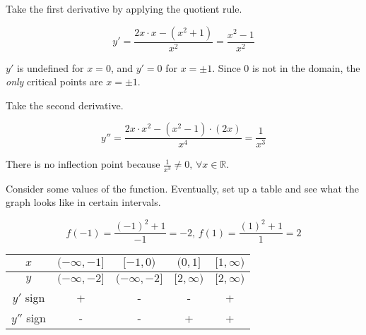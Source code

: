 \documentclass{article}
\begin{document}
\hfill

\noindent Take the first derivative by applying the quotient rule.

\begin{equation*}y' = \frac{2x\cdot x - (x^2+1)}{x^2}=\frac{x^2-1}{x^2}\end{equation*}

\hfill

\noindent $y'$ is undefined for $x=0$, and $y'=0$ for $x=\pm1$. Since 0 is not in the domain, the \textit{only} critical points are $x=\pm 1$.

\hfill

\noindent Take the second derivative.

\begin{equation*}y'' = \frac{2x\cdot x^2 - (x^2-1)\cdot(2x)}{x^4}=\frac{1}{x^3}\end{equation*}

\hfill

\noindent There is no inflection point because $\displaystyle \frac{1}{x^3} \neq 0, \, \forall x \in \mathbb{R}$.

\hfill

\noindent Consider some values of the function. Eventually, set up a table and see what the graph looks like in certain intervals.

\begin{equation*}f(-1) = \frac{(-1)^2 + 1}{-1} = -2,\,f(1) = \frac{(1)^2 + 1}{1} = 2\end{equation*}

\begin{center}
    \large
    \begin{tabular}{ |c| c c c c| } 
    \hline
        $x$ & $(-\infty, -1]$ & $[-1, 0)$ & $(0, 1]$ &  $[1, \infty)$ \\
        \hline
        $y$ & $(-\infty, -2]$ & $(-\infty, -2]$ & $[2, \infty)$ & $[2, \infty)$\\
        \hline
        $y'$ sign & + & - & - & + \\
        \hline
        $y''$ sign & - & - & + & + \\
        \hline
    \end{tabular}
\end{center}

\hfill
\end{document}
